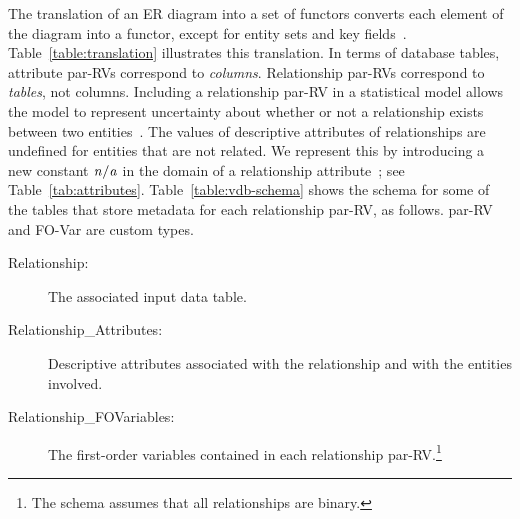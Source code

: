 The translation of an ER diagram into a set of functors converts each element of the diagram into a functor, except for entity sets and key fields~\cite{Heckerman+al:SRL07}. Table~\ref{table:translation} illustrates this translation. In terms of database tables, attribute par-RVs correspond to {\em columns}. Relationship par-RVs correspond to {\em tables}, not columns. Including a relationship par-RV in a statistical model allows the model to represent uncertainty about whether or not a relationship exists between two entities~\cite{Kimmig2015}. The values of descriptive attributes of relationships are undefined for entities that are not related. We represent this by introducing a new constant $\it{n/a}$ in the domain of a relationship attribute~\cite{Milch2005}; see Table~\ref{tab:attributes}. Table~\ref{table:vdb-schema} shows the schema for some of the tables that store metadata for 
each relationship par-RV, as follows. par-RV and FO-Var are custom types.

\begin{description}
\item[Relationship:] The associated input data table.
\item[Relationship\_Attributes:] Descriptive attributes associated with the relationship and with the entities involved.
\item[Relationship\_FOVariables:] The first-order variables contained in each relationship par-RV.\footnote{The schema assumes that all relationships are binary.}
\end{description}



\begin{table}[btp]
\caption{Translation from ER Diagram to Par-RVs}
 \centering
{}
 \label{table:translation}
\end{table}


